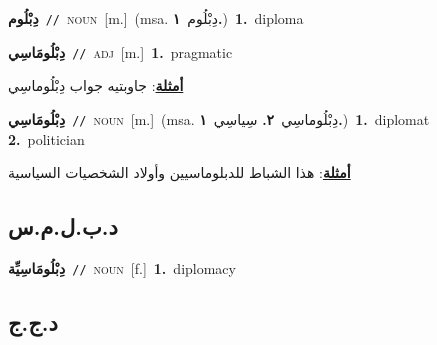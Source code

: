 \documentclass[10pt,a4paper,twoside]{article} %
\begin{document}
\begin{multicols}{2}
{{{{{{{{\setlength\topsep{0pt}\textbf{\foreignlanguage{arabic}{دِبْلُوم}}\ {\color{gray}\texttt{//}\color{black}}\ \textsc{noun}\ [m.]\ \color{gray}(msa. \foreignlanguage{arabic}{دِبْلُوم}~\foreignlanguage{arabic}{\textbf{١.}})\color{black}\ \textbf{1.}~diploma\ 

{\setlength\topsep{0pt}\textbf{\foreignlanguage{arabic}{دِبْلُومَاسِي}}\ {\color{gray}\texttt{//}\color{black}}\ \textsc{adj}\ [m.]\ \textbf{1.}~pragmatic\  \begin{flushright}\color{gray}\foreignlanguage{arabic}{\textbf{\underline{\foreignlanguage{arabic}{أمثلة}}}: جاوبتيه جواب دِبْلُوماسِي}\end{flushright}\color{black}} \vspace{2mm}

{\setlength\topsep{0pt}\textbf{\foreignlanguage{arabic}{دِبْلُومَاسِي}}\ {\color{gray}\texttt{//}\color{black}}\ \textsc{noun}\ [m.]\ \color{gray}(msa. \foreignlanguage{arabic}{دِبْلُوماسِي}~\foreignlanguage{arabic}{\textbf{٢.}}  \foreignlanguage{arabic}{سِياسِي}~\foreignlanguage{arabic}{\textbf{١.}})\color{black}\ \textbf{1.}~diplomat  \textbf{2.}~politician\  \begin{flushright}\color{gray}\foreignlanguage{arabic}{\textbf{\underline{\foreignlanguage{arabic}{أمثلة}}}: هذا الشباط للدبلوماسيين وأولاد الشخصيات السياسية}\end{flushright}\color{black}} \vspace{2mm}

\vspace{-3mm}
\subsection*{\color{blue}\foreignlanguage{arabic}{د.ب.ل.م.س}\color{blue}{ (ntws)}} 

{\setlength\topsep{0pt}\textbf{\foreignlanguage{arabic}{دِبْلُومَاسِيِّة}}\ {\color{gray}\texttt{//}\color{black}}\ \textsc{noun}\ [f.]\ \textbf{1.}~diplomacy\ 

\vspace{-3mm}
\subsection*{\color{blue}\foreignlanguage{arabic}{د.ج.ج}\color{blue}{}} 

}}}}}}}}}
\end{multicols}
\end{document}
